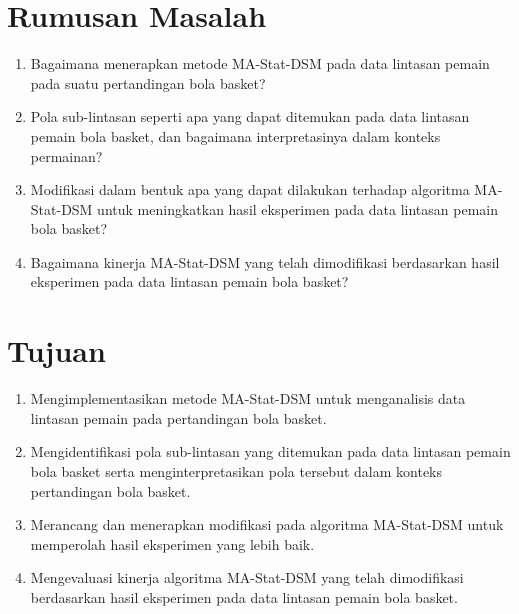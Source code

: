 \documentclass[a4paper,twoside]{article}
\begin{document}
	\section{Rumusan Masalah}
	
	\begin{enumerate}
		\item Bagaimana menerapkan metode MA-Stat-DSM pada data lintasan pemain pada suatu pertandingan bola basket?
		\item Pola sub-lintasan seperti apa yang dapat ditemukan pada data lintasan pemain bola basket, dan bagaimana interpretasinya dalam konteks permainan?
		\item Modifikasi dalam bentuk apa yang dapat dilakukan terhadap algoritma MA-Stat-DSM untuk meningkatkan hasil eksperimen pada data lintasan pemain bola basket?
		\item Bagaimana kinerja MA-Stat-DSM yang telah dimodifikasi berdasarkan hasil eksperimen pada data lintasan pemain bola basket?
	\end{enumerate}

	\section{Tujuan}
	
	\begin{enumerate}
		\item Mengimplementasikan metode MA-Stat-DSM untuk menganalisis data lintasan pemain pada pertandingan bola basket. 
		\item Mengidentifikasi pola sub-lintasan yang ditemukan pada data lintasan pemain bola basket serta menginterpretasikan pola tersebut dalam konteks pertandingan bola basket.
		\item Merancang dan menerapkan modifikasi pada algoritma MA-Stat-DSM untuk memperolah hasil eksperimen yang lebih baik.
		\item Mengevaluasi kinerja algoritma MA-Stat-DSM yang telah dimodifikasi berdasarkan hasil eksperimen pada data lintasan pemain bola basket.
	\end{enumerate}
\end{document}

